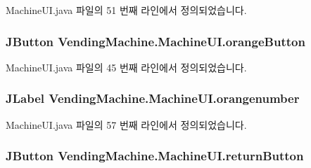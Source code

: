 Machine\+U\+I.\+java 파일의 51 번째 라인에서 정의되었습니다.

\subsubsection[{\texorpdfstring{orange\+Button}{orangeButton}}]{\setlength{\rightskip}{0pt plus 5cm}J\+Button Vending\+Machine.\+Machine\+U\+I.\+orange\+Button\hspace{0.3cm}{\ttfamily [private]}}\hypertarget{class_vending_machine_1_1_machine_u_i_ab42b9c2a41e85ceda94fd22154b6b5ee}{}\label{class_vending_machine_1_1_machine_u_i_ab42b9c2a41e85ceda94fd22154b6b5ee}


Machine\+U\+I.\+java 파일의 45 번째 라인에서 정의되었습니다.

\subsubsection[{\texorpdfstring{orangenumber}{orangenumber}}]{\setlength{\rightskip}{0pt plus 5cm}J\+Label Vending\+Machine.\+Machine\+U\+I.\+orangenumber\hspace{0.3cm}{\ttfamily [private]}}\hypertarget{class_vending_machine_1_1_machine_u_i_a031861a0a732903b63d565b0a612638f}{}\label{class_vending_machine_1_1_machine_u_i_a031861a0a732903b63d565b0a612638f}


Machine\+U\+I.\+java 파일의 57 번째 라인에서 정의되었습니다.

\subsubsection[{\texorpdfstring{return\+Button}{returnButton}}]{\setlength{\rightskip}{0pt plus 5cm}J\+Button Vending\+Machine.\+Machine\+U\+I.\+return\+Button\hspace{0.3cm}{\ttfamily [private]}}\hypertarget{class_vending_machine_1_1_machine_u_i_ad82aa0418636517fefcd1ec842d44523}{}\label{class_vending_machine_1_1_machine_u_i_ad82aa0418636517fefcd1ec842d44523}


